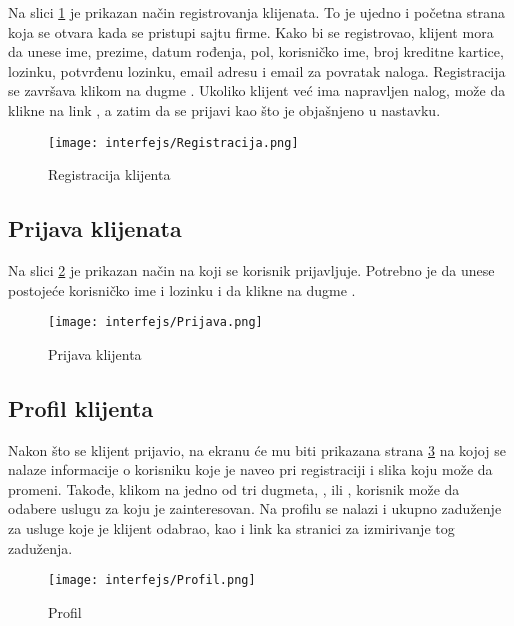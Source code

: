 \documentclass[a4paper]{article}
\begin{document}
Na slici \ref{fig:ki_reg} je prikazan način registrovanja klijenata. To je ujedno i početna strana koja se otvara kada se pristupi sajtu firme. Kako bi se registrovao, klijent mora da unese ime, prezime, datum rođenja, pol, korisničko ime, broj kreditne kartice, lozinku, potvrđenu lozinku, email adresu i email za povratak naloga. Registracija se završava klikom na dugme . Ukoliko klijent već ima napravljen nalog, može da klikne na link , a zatim da se prijavi kao što je objašnjeno u nastavku.

\begin{figure}[H]
    \centering
    \texttt{[image: interfejs/Registracija.png]}
    \caption{Registracija klijenta}
    \label{fig:ki_reg}
\end{figure}

\subsection{Prijava klijenata}

Na slici \ref{fig:ki_prijava} je prikazan način na koji se korisnik prijavljuje. Potrebno je da unese postojeće korisničko ime i lozinku i da klikne na dugme .

\begin{figure}[H]
    \centering
    \texttt{[image: interfejs/Prijava.png]}
    \caption{Prijava klijenta}
    \label{fig:ki_prijava}
\end{figure}

\subsection{Profil klijenta}

Nakon što se klijent prijavio, na ekranu će mu biti prikazana strana \ref{fig:ki_profil} na kojoj se nalaze informacije o korisniku koje je naveo pri registraciji i slika koju može da promeni. Takođe, klikom na jedno od tri dugmeta, ,   ili , korisnik može da odabere uslugu za koju je zainteresovan. Na profilu se nalazi i ukupno zaduženje za usluge koje je klijent odabrao, kao i link  ka stranici za izmirivanje tog zaduženja.


\begin{figure}[H]
    \centering
    \texttt{[image: interfejs/Profil.png]}
    \caption{Profil}
    \label{fig:ki_profil}
\end{figure}
\end{document}
